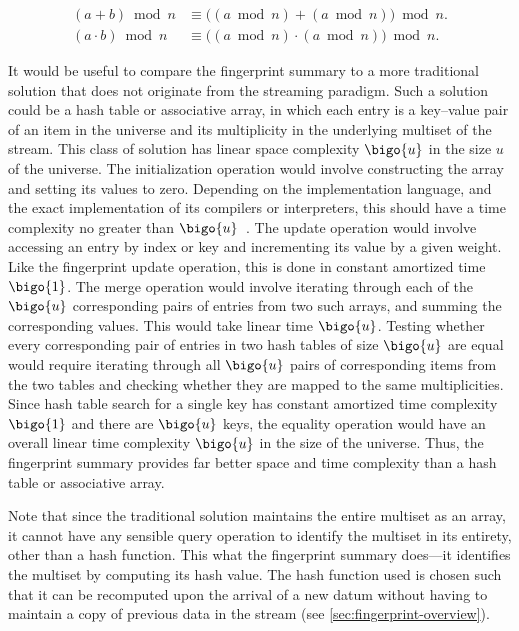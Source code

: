 \begin{align}
  \label{eq:fingerprint-analysis-complexity-modulo-addition}
  (a + b) \bmod n &\equiv \bigl( (a \bmod n) + (a \bmod n) \bigr) \bmod n. \\
  \label{eq:fingerprint-analysis-complexity-modulo-multiplication}
  (a \cdot b) \bmod n &\equiv \bigl( (a \bmod n) \cdot (a \bmod n) \bigr) \bmod n.
\end{align}

It would be useful to compare the fingerprint summary to a more traditional solution that does not originate from the streaming paradigm.
Such a solution could be a hash table or associative array, in which each entry is a key--value pair of an item in the universe and its multiplicity in the underlying multiset of the stream.
This class of solution has linear space complexity \( \bigo{u} \) in the size \( u \) of the universe.
The initialization operation would involve constructing the array and setting its values to zero.
Depending on the implementation language, and the exact implementation of its compilers or interpreters, this should have a time complexity no greater than \( \bigo{u} \)~\citep{bentley00}.
The update operation would involve accessing an entry by index or key and incrementing its value by a given weight.
Like the fingerprint update operation, this is done in constant amortized time \( \bigo{1} \).
The merge operation would involve iterating through each of the \( \bigo{u} \) corresponding pairs of entries from two such arrays, and summing the corresponding values.
This would take linear time \( \bigo{u} \).
Testing whether every corresponding pair of entries in two hash tables of size \( \bigo{u} \) are equal would require iterating through all \( \bigo{u} \) pairs of corresponding items from the two tables and checking whether they are mapped to the same multiplicities.
Since hash table search for a single key has constant amortized time complexity \( \bigo{1} \) and there are \( \bigo{u} \) keys, the equality operation would have an overall linear time complexity \( \bigo{u} \) in the size of the universe.
Thus, the fingerprint summary provides far better space and time complexity than a hash table or associative array.

Note that since the traditional solution maintains the entire multiset as an array, it cannot have any sensible query operation to identify the multiset in its entirety, other than a hash function.
This what the fingerprint summary does---it identifies the multiset by computing its hash value.
The hash function used is chosen such that it can be recomputed upon the arrival of a new datum without having to maintain a copy of previous data in the stream (see \cref{sec:fingerprint-overview}).

